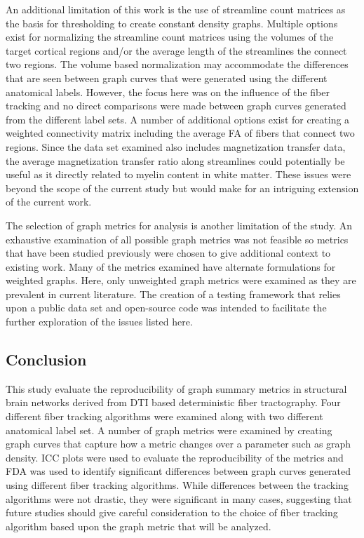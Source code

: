 \documentclass{frontiersSCNS} %
\begin{document}
An additional limitation of this work is the use of streamline count matrices as the basis for thresholding to create constant
density graphs. Multiple options exist for normalizing the streamline count matrices using the volumes of 
the target cortical regions and/or the average length of the streamlines the connect two regions. The volume based
normalization may accommodate the differences that are seen between graph curves that were generated using 
the different anatomical labels. However, the focus here was on the influence of the fiber tracking and no direct
comparisons were made between graph curves generated from the different label sets. A number of additional options
exist for creating a weighted connectivity matrix including the average FA of fibers that connect two regions. Since the data set
examined also includes magnetization transfer data, the average magnetization transfer ratio along streamlines 
could potentially be useful as it directly related to myelin content in white matter. These issues were beyond the scope 
of the current study but would make for an intriguing extension of the current work. 

The selection of graph metrics for analysis is another limitation of the study. An exhaustive examination of all
possible graph metrics was not feasible so metrics that have been studied previously were chosen to give additional
context to existing work. Many of the metrics examined have alternate formulations for 
weighted graphs. Here, only unweighted graph metrics were examined as they are prevalent in current literature.
 The creation of a testing framework that relies upon a public data set and open-source code
was intended to facilitate the further exploration of the issues listed here.

\subsection{Conclusion}
This study evaluate the reproducibility of graph summary metrics in structural brain networks derived from
DTI based deterministic fiber tractography. Four different fiber tracking algorithms were examined along
with two different anatomical label set. A number of graph metrics were examined by creating graph curves that capture how a metric
changes over a parameter such as graph density. ICC plots were used to evaluate the reproducibility of the metrics and FDA
was used to identify significant differences between graph curves generated using different fiber tracking algorithms.
While differences between the tracking algorithms were not drastic, they were significant in many cases, suggesting
that future studies should give careful consideration to the choice of fiber tracking algorithm based upon the graph
metric that will be analyzed. 
\end{document}
